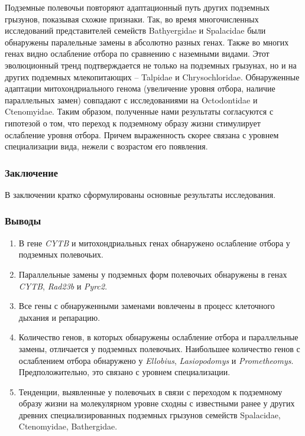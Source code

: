 Подземные полевочьи повторяют адаптационный путь других подземных грызунов, показывая схожие признаки. Так, во время многочисленных исследований представителей семейств Bathyergidae и  Spalacidae были обнаружены паралельные замены в абсолютно разных генах. Также во многих генах видно ослабление отбора по сравнению с наземными видами. Этот эволюционный тренд подтверждается не только на подземных грызунах, но и на других подземных млекопитающих --  Talpidae и Chrysochloridae. Обнаруженные адаптации митохондриального генома (увеличение уровня отбора, наличие параллельных замен) совпадают с исследованиями на Octodontidae и Ctenomyidae. Таким образом, полученные нами результаты согласуются с гипотезой о том, что переход к подземному образу жизни стимулирует ослабление уровня отбора. Причем выраженность скорее связана с уровнем специализации вида, нежели с возрастом его появления.


\subsubsection*{Заключение}
В заключении кратко сформулированы основные результаты исследования.

\subsubsection*{Выводы}

\begin{enumerate}
	
	\item В гене \textit{CYTB} и митохондриальных генах обнаружено ослабление отбора у подземных полевочьих. 
	
	\item Параллельные замены у подземных форм полевочьих обнаружены в генах \textit{CYTB}, \textit{Rad23b} и \textit{Pyrc2}.
	
	\item Все гены с обнаруженными заменами вовлечены в процесс клеточного дыхания и репарацию.  
	
	\item Количество генов, в которых обнаружены ослабление отбора и параллельные замены, отличается у подземных полевочьих. Наибольшее количество генов с ослаблением отбора обнаружено у \textit{Ellobius}, \textit{Lasiopodomys} и \textit{Prometheomys}. Предположительно, это связано с уровнем специализации.
	
	\item Тенденции, выявленные у полевочьих в связи с переходом к подземному образу жизни на молекулярном уровне сходны с известными ранее у других древних специализированных подземных грызунов семейств Spalacidae, Ctenomyidae, Bathergidae.
	
\end{enumerate}


